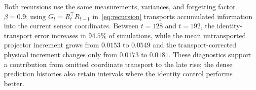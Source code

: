 Both recursions use the same measurements, variances, and forgetting factor $\beta=0.9$; using $G_t=R_t^\top R_{t-1}$ in~\eqref{eq:recursion} transports accumulated information into the current sensor coordinates.
Between $t=128$ and $t=192$, the identity-transport error increases in $94.5\%$ of simulations, while the mean untransported projector increment grows from $0.0153$ to $0.0549$ and the transport-corrected physical increment changes only from $0.0173$ to $0.0181$.
These diagnostics support a contribution from omitted coordinate transport to the late rise; the dense prediction histories also retain intervals where the identity control performs better.
